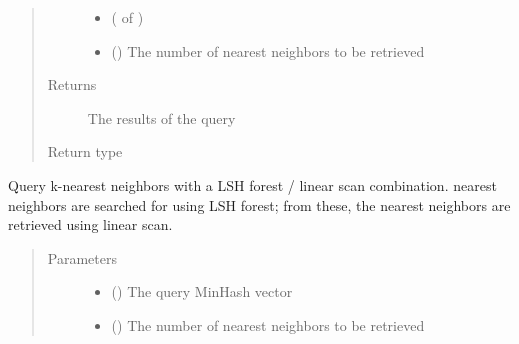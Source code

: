 \documentclass[letterpaper,10pt,english]{sphinxmanual}
\begin{document}
\begin{fulllineitems}
\begin{fulllineitems}
\begin{quote}
\begin{description}
\begin{itemize}
\item {} 
 ( of ) \textendash{} 

\item {} 
 () \textendash{} The number of nearest neighbors to be retrieved

\end{itemize}

\item[{Returns}] \leavevmode
The results of the query

\item[{Return type}] \leavevmode
{}

\end{description}\end{quote}

\end{fulllineitems}


\begin{fulllineitems}
\label{\detokenize{documentation:tmap.LSHForest.query_linear_scan}}
Query k-nearest neighbors with a LSH forest / linear scan combination.  nearest neighbors are searched for using LSH forest; from these, the  nearest neighbors are retrieved using linear scan.
\begin{quote}\begin{description}
\item[{Parameters}] \leavevmode\begin{itemize}
\item {} 
 () \textendash{} The query MinHash vector

\item {} 
 () \textendash{} The number of nearest neighbors to be retrieved


\end{itemize}
\end{description}
\end{quote}
\end{fulllineitems}
\end{fulllineitems}
\end{document}
